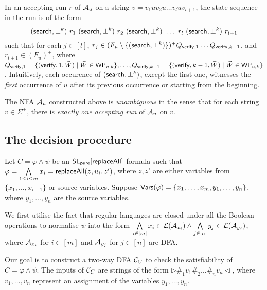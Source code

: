 \documentclass{llncs}
\begin{document}
In an accepting run $r$ of $\mathcal{A}_u$ on a string $v = v_1 u v_2 u \dots v_l u v_{l+1}$, the state sequence in the run is of the form 
$$(\search, \bot^k)\ r_1\ (\search, \bot^k)\ r_2\ (\search, \bot^k)\ \dots\ r_l\ (\search, \bot^k)\ r_{l+1}$$ 
such that  for each $j \in [l]$, $r_j \in (F_u \setminus \{(\mathsf{search}, \bot^k)\})^+ Q_{\mathsf{verify}, 1}  \dots  Q_{\mathsf{verify}, k-1}$, and $r_{l+1} \in (F_u)^+$, where $Q_{\mathsf{verify}, 1} = \{(\mathsf{verify}, 1, \vec{W}) \mid \vec{W} \in \mathsf{WP}_{u,k}\}, \dots, Q_{\mathsf{verify}, k-1}=\{(\mathsf{verify}, k-1, \vec{W}) \mid \vec{W} \in \mathsf{WP}_{u, k}\}$. Intuitively, each occurence of $(\mathsf{search}, \bot^k)$, except the first one, witnesses the \emph{first} occurrence of $u$ after its previous occurrence or starting from the beginning.

The NFA $\mathcal{A}_u$ constructed above is \emph{unambiguous} in the sense that for each string $v \in \Sigma^+$, there is \emph{exactly one accepting run} of $\mathcal{A}_u$ on $v$.


\subsection{The decision procedure}

Let $C= \varphi \wedge \psi$ be an $\mathsf{SL_{pure}}[\mathsf{replaceAll}]$ formula such that $\varphi = \bigwedge \limits_{1 \le i \le m} x_i = \mathsf{replaceAll}(z, u_i, z')$, where $z, z'$ are either variables from $\{x_1,\dots, x_{i-1}\}$ or source variables. Suppose $\mathsf{Vars}(\varphi) = \{x_1,\dots, x_m, y_1, \dots, y_n\}$, where $y_1,\dots, y_n$ are the source variables. 

We first utilise the fact that regular languages are closed under all the Boolean operations to normalise $\psi$ into the form $\bigwedge \limits_{i \in [m]} x_i \in \mathcal{L}(\mathcal{A}_{x_i}) \wedge \bigwedge \limits_{j \in [n]} y_j \in \mathcal{L}(\mathcal{A}_{y_j})$, where $\mathcal{A}_{x_i}$ for $i \in [m]$ and $\mathcal{A}_{y_j}$ for $j \in [n]$ are DFA. 


Our goal is to construct a two-way DFA $\mathcal{C}_C$ to check the satisfiability of $C=\varphi \wedge \psi$. The inputs of $\mathcal{C}_C$ are strings of the form $\triangleright \#_1 v_1 \#_2 \dots \#_n v_n\triangleleft$, where $v_1,\dots, v_n$ represent an assignment of the variables $y_1,\dots,y_n$.

\end{document}
